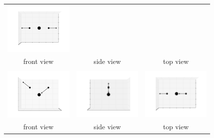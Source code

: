 \documentclass[11pt]{article}
\begin{document}
\begin{figure}[htp]
\begin{tabular}{|ccc|}
	\includegraphics[width=5.5cm,clip=true,trim=3cm 2cm 3cm 2cm]{90-0_7.pdf}\\front view&side view&top view\\\hline&&\\
	\includegraphics[width=5.5cm,clip=true,trim=3cm 2cm 3cm 2cm]{0-0_8.pdf}&
	\includegraphics[width=5.5cm,clip=true,trim=3cm 2cm 3cm 2cm]{0-90_8.pdf}&
	\includegraphics[width=5.5cm,clip=true,trim=3cm 2cm 3cm 2cm]{90-0_8.pdf}\\front view&side view&top view\\\hline
	\end{tabular}
\end{figure}

\newpage
\end{document}
